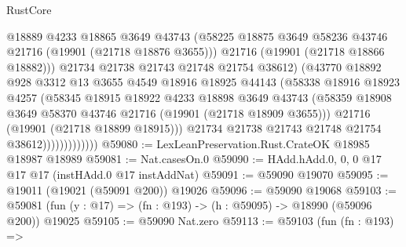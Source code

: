 \begin{lexlean}{RustCore}
\begin{coremodule}
                              @18889
                              @4233
                              @18865
                              @3649
                              @43743
                              (@58225
                                @18875
                                @3649
                                @58236
                                @43746
                                @21716
                                (@19901 (@21718 @18876 @3655)))
                              @21716
                              (@19901 (@21718 @18866 @18882)))
                            @21734
                            @21738
                            @21743
                            @21748
                            @21754
                            @38612)
                          (@43770
                            @18892
                            @928
                            @3312
                            @13
                            @3655
                            @4549
                            @18916
                            @18925
                            @44143
                            (@58338
                              @18916
                              @18923
                              @4257
                              (@58345
                                @18915
                                @18922
                                @4233
                                @18898
                                @3649
                                @43743
                                (@58359
                                  @18908
                                  @3649
                                  @58370
                                  @43746
                                  @21716
                                  (@19901 (@21718 @18909 @3655)))
                                @21716
                                (@19901 (@21718 @18899 @18915)))
                              @21734
                              @21738
                              @21743
                              @21748
                              @21754
                              @38612)))))))))))))
@59080 := LexLeanPreservation.Rust.CrateOK @18985 @18987 @18989
@59081 := Nat.casesOn.{0}
@59090 := HAdd.hAdd.{0, 0, 0} @17 @17 @17 (instHAdd.{0} @17 instAddNat)
@59091 := @59090 @19070
@59095 := @19011 (@19021 (@59091 @200)) @19026
@59096 := @59090 @19068
@59103 := @59081 (fun (y : @17) => (fn : @193) -> (h : @59095) -> @18990 (@59096 @200)) @19025
@59105 := @59090 Nat.zero
@59113 := @59103
    (fun (fn : @193) =>

\end{coremodule}
\end{lexlean}
